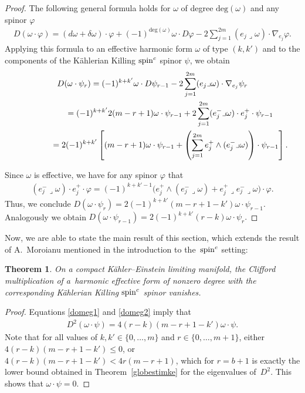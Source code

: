 \documentclass[pdftex]{sigma}
\numberwithin{equation}{section}
\newtheorem{thm}{Theorem}[section]
\theoremstyle{definition}
\begin{document}
\begin{proof}
The following general formula  holds for {\color{black}{any form}} $\omega$ of degree $\text{deg}(\omega)$ and any spinor $\varphi$
\begin{gather*}D(\omega\cdot\varphi)=(d\omega+\delta\omega)\cdot\varphi+(-1)^{\text{deg}(\omega)} \omega\cdot D\varphi -2\sum_{j=1}^{2m}(e_j\lrcorner\omega)\cdot \nabla_{e_j}\varphi.\end{gather*}
Applying this formula to an ef\/fective harmonic form $\omega$ of type $(k, k')$ and to the components of the  K\"ahlerian Killing ${\mathop{\rm spin}^c}$ spinor $\psi$, we obtain
\begin{gather*}
D(\omega\cdot\psi_{r}) = (-1)^{k+k'} \omega\cdot D\psi_{r-1}-2\sum_{j=1}^{2m}(e_j\lrcorner\omega)\cdot \nabla_{e_j}\psi_{r}\\
\hphantom{D(\omega\cdot\psi_{r})}{}
 =(-1)^{k+k'} 2(m-r+1) \omega\cdot\psi_{r-1}+2\sum_{j=1}^{2m}(e^-_j\lrcorner\omega)\cdot e^+_j\cdot \psi_{r-1}\\
\hphantom{D(\omega\cdot\psi_{r})}{}
=2(-1)^{k+k'} \left[(m-r+1) \omega\cdot\psi_{r-1}+\left(\sum_{j=1}^{2m} e^+_j\wedge(e^-_j\lrcorner\omega)\right)\cdot\psi_{r-1}\right].
\end{gather*}

Since $\omega$ is ef\/fective, we have for any spinor $\varphi$ that
\begin{gather*}(e^-_j\lrcorner\omega)\cdot e^+_j\cdot \varphi=(-1)^{k+k'-1} \big(e^+_j\wedge(e^-_j\lrcorner\omega)+e^+_j\lrcorner e^-_j\lrcorner\omega \big)\cdot \varphi.\end{gather*}
Thus, we conclude $D(\omega\cdot\psi_{r}) = 2 (-1)^{k+k'} (m-r+1-k') \omega\cdot \psi_{r-1}$.
Analogously we obtain $D(\omega\cdot\psi_{r-1})=2(-1)^{k+k'} (r-k) \omega\cdot\psi_{r}.$
\end{proof}

Now, we are able to state the main result of this section, which extends the result of A.~Moroianu mentioned in the introduction to the~${\mathop{\rm spin}^c}$ setting:
\begin{thm} \label{eff}
On a compact K\"ahler--Einstein limiting manifold, the Clifford multiplication of a~harmonic effective form of nonzero degree with the corresponding  K\"ahlerian Killing ${\mathop{\rm spin}^c}$ spinor vanishes.
\end{thm}

\begin{proof}
Equations \eqref{domeg1} and \eqref{domeg2} imply that
\begin{gather*}
D^2 (\omega \cdot \psi) = 4 (r-k)(m-r+1-k')  \omega\cdot \psi.
\end{gather*}
Note that for all values of $k,k' \in\{0,\dots,m\}$ and $r\in\{0,\dots, m+1\}$, either $4 (r-k)(m-r+1-k') \leq 0$, or $4 (r-k)(m-r+1-k') < 4r(m-r+1)$, which for $r=b+1$ is exactly the lower bound obtained in Theorem~\ref{globestimke} for the eigenvalues of~$D^2$. This shows that $\omega\cdot\psi=0$.
\end{proof}
\end{document}

